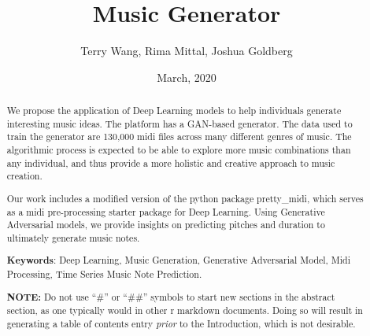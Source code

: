 \documentclass[12pt,oneside]{chicagocapstone}
\title{Music Generator}
\author{Terry Wang, Rima Mittal, Joshua Goldberg}
\date{March, 2020} %
\begin{document}
  \maketitle

\frontmatter %
\pagestyle{empty} %


  \begin{abstract}
    We propose the application of Deep Learning models to help individuals generate interesting music ideas. The platform has a GAN-based generator. The data used to train the generator are 130,000 midi files across many different genres of music. The algorithmic process is expected to be able to explore more music combinations than any individual, and thus provide a more holistic and creative approach to music creation.
    
    Our work includes a modified version of the python package pretty\_midi, which serves as a midi pre-processing starter package for Deep Learning. Using Generative Adversarial models, we provide insights on predicting pitches and duration to ultimately generate music notes.
    
    \bigskip 
    \bigskip
    \bigskip
    
    \textbf{Keywords}: Deep Learning, Music Generation, Generative Adversarial Model, Midi Processing, Time Series Music Note Prediction.
    
    \bigskip 
    \bigskip
    \bigskip
    
    \textbf{NOTE:} Do not use ``\#'' or ``\#\#'' symbols to start new sections in the abstract section, as one typically would in other r markdown documents. Doing so will result in generating a table of contents entry \emph{prior} to the Introduction, which is not desirable.
  \end{abstract}
\end{document}
